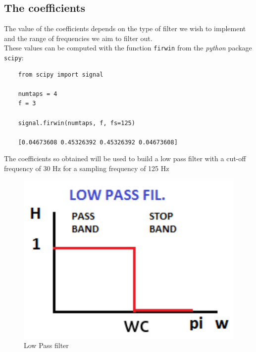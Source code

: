 \documentclass[11pt,a4paper,twocolumn]{IEEEtran}
\begin{document}
	\subsection*{The coefficients}
	The value of the coefficients depends on the type of filter we wish to implement and the range of frequencies we aim to filter out.\\
	These values can be computed with the function \texttt{firwin} from the \emph{python} package \texttt{scipy}:
	\begin{lstlisting}
	from scipy import signal
	
	numtaps = 4
	f = 3
	
	signal.firwin(numtaps, f, fs=125)
	
	[0.04673608 0.45326392 0.45326392 0.04673608]
	\end{lstlisting}
	The coefficients so obtained will be used to build a low pass filter with a cut-off frequency of 30 Hz for a sampling frequency of 125 Hz
	\begin{figure}[h]
		\centering
		\includegraphics[width=0.7\linewidth]{img/lowpass}
		\caption{Low Pass filter}
	\end{figure}
\end{document}
